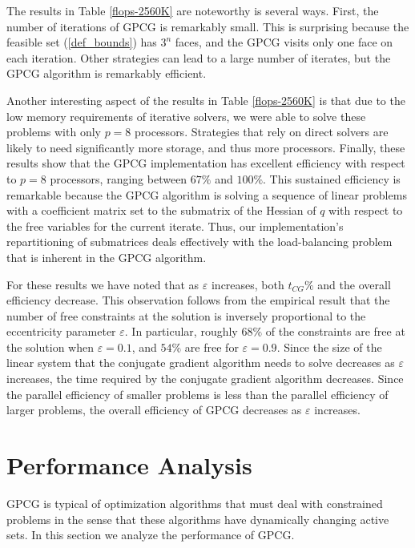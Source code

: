 \documentclass{esub2acm}
\newcommand{\Ref}[1]{\mbox{\rm{(\ref{#1})}}}
\begin{document}
The results in Table \ref{flops-2560K} are noteworthy is several ways.
First, the number of iterations of GPCG is remarkably small.
This is surprising because the feasible set \Ref{def_bounds}
has $ 3^n $ faces, and the
GPCG visits only one face on each iteration.
Other strategies can lead to a large number of 
iterates, but the GPCG algorithm is remarkably efficient.

Another interesting aspect of the results in Table \ref{flops-2560K}
is that due to the
low memory requirements of iterative solvers, we were able
to solve these problems with only $ p = 8 $ processors.
Strategies that rely on direct solvers are likely to need
significantly more storage, and thus more processors.
Finally, these results show that the GPCG implementation has
excellent efficiency with 
respect to $ p = 8 $ processors,
ranging between $ 67\% $ and $ 100\% $.
This sustained efficiency is remarkable because the 
GPCG algorithm is solving a sequence
of linear problems with a
coefficient matrix set to the submatrix of the Hessian of $q$ with 
respect to the
free variables for the current iterate.
Thus, our implementation's repartitioning of submatrices deals effectively
with the load-balancing problem that is inherent
in the GPCG algorithm.

For these results we have noted that as $ \varepsilon $ increases,
both $t_{CG}\%$ and the overall efficiency decrease.
This observation follows from the empirical result
that the number of free constraints
at the solution is inversely proportional to the eccentricity
parameter $ \varepsilon $.
In particular, roughly $ 68 \% $ of the constraints are free at the
solution when $ \varepsilon = 0.1 $, and $ 54\% $ are free for
$ \varepsilon = 0.9 $.
Since the size of the linear system
that the conjugate gradient algorithm needs to solve decreases
as $ \varepsilon $ increases, the time required
by the conjugate gradient algorithm decreases.
Since the parallel efficiency of smaller problems is less than the
parallel efficiency of larger problems, the overall efficiency of GPCG
decreases as  $ \varepsilon $ increases.

\section{Performance Analysis}

\label{sec:analysis}

GPCG is typical of optimization algorithms that
must deal with constrained problems in the sense that these
algorithms have dynamically changing active sets.
In this section we analyze the performance of GPCG.
\end{document}
